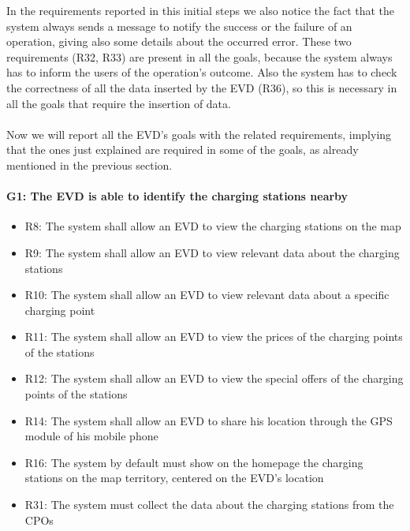 In the requirements reported in this initial steps we also notice the fact that the system always sends a message to notify the success or the failure of an operation, giving also some details about the occurred error. These two requirements (R32, R33) are present in all the goals, because the system always has to inform the users of the operation's outcome. Also the system has to check the correctness of all the data inserted by the EVD (R36), so this is necessary in all the goals that require the insertion of data.\\\\
Now we will report all the EVD's goals with the related requirements, implying that the ones just explained are required in some of the goals, as already mentioned in the previous section.

\paragraph{G1: The EVD is able to identify the charging stations nearby}
\begin{itemize}
    \item R8: The system shall allow an EVD to view the charging stations on the map
    \item R9: The system shall allow an EVD to view relevant data about the charging stations
    \item R10: The system shall allow an EVD to view relevant data about a specific charging point
    \item R11: The system shall allow an EVD to view the prices of the charging points of the stations
    \item R12: The system shall allow an EVD to view the special offers of the charging points of the stations
    \item R14: The system shall allow an EVD to share his location through the GPS module of his mobile phone
    \item R16: The system by default must show on the homepage the charging stations on the map territory, centered on the EVD's location
    \item R31: The system must collect the data about the charging stations from the CPOs
\end{itemize}
